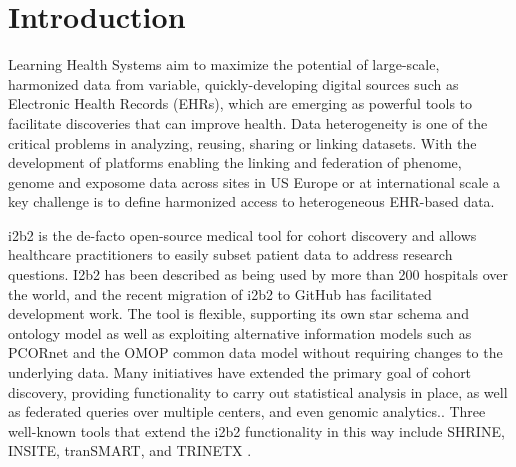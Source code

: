 \documentclass{amia}
\newcommand{\remPierre}[1]{\todo[color=green]{[PZ]{\scriptsize #1\par}}}
\newcommand{\remNico}[1]{\todo[color=orange]{[NP]{\scriptsize #1\par}}}
\begin{document}
\section*{Introduction}
Learning Health Systems aim to maximize the potential of large-scale, harmonized data from variable, quickly-developing digital sources such as Electronic Health Records (EHRs), which are emerging as powerful tools to facilitate discoveries that can improve health. Data heterogeneity is one of the critical problems in analyzing, reusing, sharing or linking datasets. With the development of platforms enabling the linking and federation of phenome, genome and exposome data across sites in US\cite{Gottesman_2013,McMurry_2013} Europe\cite{DeMoor_2015,Delaney_2015} or at international scale\cite{Hripcsak_2015} a key challenge is to define harmonized access to heterogeneous EHR-based data.

i2b2 is the de-facto open-source medical tool for cohort discovery and allows healthcare practitioners to easily subset patient data to address research questions. I2b2 has been described as being used by more than 200 hospitals\cite{pmid22081225} over the world, and the recent migration of i2b2 to GitHub has facilitated development work. The tool is flexible, supporting its own star schema and ontology model as well as exploiting alternative information models such as PCORnet\cite{Klann_2016} and the OMOP common data model\cite{i2b2-omop} without requiring changes to the underlying data. Many initiatives have extended the primary goal of cohort discovery, providing functionality to carry out statistical analysis in place, as well as federated queries over multiple centers, and even genomic analytics.\cite{Scheufele__2014,i2b2-transmart}. Three well-known tools that extend the i2b2 functionality in this way include SHRINE, INSITE, tranSMART, and TRINETX \cite{shrine,insite,trinetx,Scheufele__2014}.   
\end{document}

